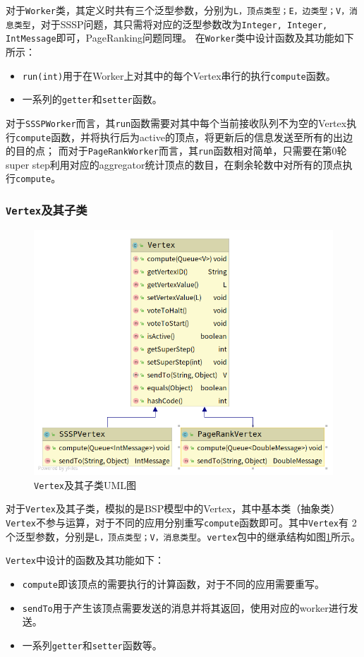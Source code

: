 \documentclass{ML}
\begin{document}
对于\texttt{Worker}类，其定义时共有三个泛型参数，分别为\texttt{L，顶点类型；E，边类型；V，消息类型}，对于SSSP问题，其只需将对应的泛型参数改为\texttt{Integer, Integer, IntMessage}即可，PageRanking问题同理。
在\texttt{Worker}类中设计函数及其功能如下所示：
\begin{itemize}
    \item \texttt{run(int)}用于在Worker上对其中的每个Vertex串行的执行\texttt{compute}函数。
    \item 一系列的\texttt{getter}和\texttt{setter}函数。
\end{itemize}

对于\texttt{SSSPWorker}而言，其\texttt{run}函数需要对其中每个当前接收队列不为空的Vertex执行\texttt{compute}函数，并将执行后为active的顶点，将更新后的信息发送至所有的出边的目的点；
而对于\texttt{PageRankWorker}而言，其\texttt{run}函数相对简单，只需要在第0轮super step利用对应的aggregator统计顶点的数目，在剩余轮数中对所有的顶点执行\texttt{compute}。

\subsubsection{\texttt{Vertex}及其子类}
\begin{figure}[htb]
    \centering
    \includegraphics[width=0.7\linewidth]{media/vertex.png}
    \caption{\texttt{Vertex}及其子类UML图}\label{fig:vertex}
\end{figure}
对于\texttt{Vertex}及其子类，模拟的是BSP模型中的Vertex，其中基本类（抽象类）\texttt{Vertex}不参与运算，对于不同的应用分别重写\texttt{compute}函数即可。其中\texttt{Vertex}有
2个泛型参数，分别是\texttt{L，顶点类型；V，消息类型}。\texttt{vertex}包中的继承结构如图\ref{fig:vertex}所示。

\texttt{Vertex}中设计的函数及其功能如下：
\begin{itemize}
    \item \texttt{compute}即该顶点的需要执行的计算函数，对于不同的应用需要重写。
    \item \texttt{sendTo}用于产生该顶点需要发送的消息并将其返回，使用对应的worker进行发送。
    \item 一系列\texttt{getter}和\texttt{setter}函数等。
\end{itemize}
\end{document}
